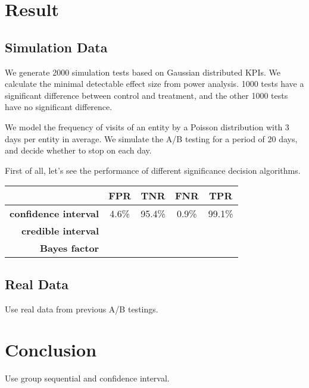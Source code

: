 \documentclass[paper=a4, fontsize=11pt]{scrartcl} %
\numberwithin{equation}{section} %
\numberwithin{figure}{section} %
\numberwithin{table}{section} %
\begin{document}
\section{Result}

\subsection{Simulation Data}
We generate 2000 simulation tests based on Gaussian distributed KPIs. We calculate the minimal detectable effect size from power analysis. 1000 tests have a significant difference between control and treatment, and the other 1000 tests have no significant difference. 

We model the frequency of visits of an entity by a Poisson distribution with 3 days per entity in average. We simulate the A/B testing for a period of 20 days, and decide whether to stop on each day.

First of all, let's see the performance of different significance decision algorithms.
\begin{center}
  \begin{tabular}{ | r | c | c | c | c | }
    \hline
    & FPR & TNR & FNR & TPR \\ \hline
    \textbf{confidence interval} & 4.6\% & 95.4\%  & 0.9\% & 99.1\% \\ \hline
    \textbf{credible interval} &  &  &  & \\ \hline
    \textbf{Bayes factor} &  &  & & \\
    \hline
  \end{tabular}
\end{center}


\subsection{Real Data}
Use real data from previous A/B testings.

\section{Conclusion}
Use group sequential and confidence interval.

\end{document}
